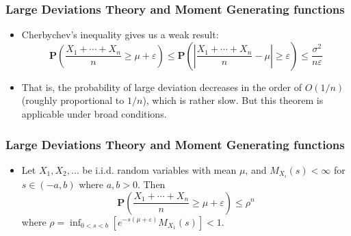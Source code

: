 \documentclass[handout]{beamer}
\newcommand{\BP}{\mathbf{P}}
\begin{document}
\frame
{
  \frametitle{Large Deviations Theory and Moment Generating functions} 

   \begin{itemize}

                 \item<1-> Cherbychev's inequality gives us a weak result:
                                  $$\BP\left(\frac{X_1+\cdots+X_n}{n}\geq \mu+\varepsilon\right)\leq \BP\left(\left|\frac{X_1+\cdots+X_n}{n}-\mu\right|\geq \varepsilon \right)\leq \frac{\sigma^2}{ n \varepsilon}$$
                            

               \item<2->[] That is, the probability of large deviation decreases in the order of $O(1/n)$ (roughly proportional to $1/n$), which is rather slow. But this theorem is applicable under broad conditions. 
          
          
                            \end{itemize}
}


\frame
{
  \frametitle{Large Deviations Theory and Moment Generating functions} 

   \begin{itemize}

                 \item<1->[] \begin{Theorem} Let $X_1, X_2,\ldots$ be i.i.d. random variables with mean $\mu$, and $M_{X_i}(s) <\infty $ for $s\in (-a, b)$ where $a, b>0$. Then 
               $$\BP \left( \frac{X_1+\cdots+X_n}{n}\geq \mu+\varepsilon \right) \leq \rho^n$$
               where $\rho=\inf_{0<s<b} [e^{-s(\mu+\varepsilon)} M_{X_1} (s) ]<1.$
                            \end{Theorem}
          
          
                            \end{itemize}
}
\end{document}
